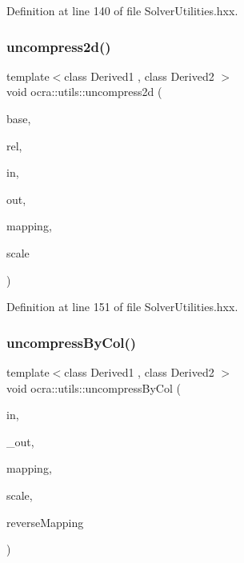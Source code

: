 Definition at line 140 of file Solver\+Utilities.\+hxx.

\hypertarget{namespaceocra_1_1utils_a5189699a011acaa6413bd14c178254c3}{}\label{namespaceocra_1_1utils_a5189699a011acaa6413bd14c178254c3} 
\subsubsection{\texorpdfstring{uncompress2d()}{uncompress2d()}\hspace{0.1cm}{\footnotesize\ttfamily [2/2]}}
{\footnotesize\ttfamily template$<$class Derived1 , class Derived2 $>$ \\
void ocra\+::utils\+::uncompress2d (\begin{DoxyParamCaption}\item[{const \hyperlink{classocra_1_1Variable}{Variable} \&}]{base,  }\item[{const \hyperlink{classocra_1_1Variable}{Variable} \&}]{rel,  }\item[{const Matrix\+Base$<$ Derived1 $>$ \&}]{in,  }\item[{Matrix\+Base$<$ Derived2 $>$ const \&}]{out,  }\item[{std\+::vector$<$ int $>$ \&}]{mapping,  }\item[{double}]{scale }\end{DoxyParamCaption})\hspace{0.3cm}{\ttfamily [inline]}}



Definition at line 151 of file Solver\+Utilities.\+hxx.

\hypertarget{namespaceocra_1_1utils_adecf442a59dee26f5836a070533bcac4}{}\label{namespaceocra_1_1utils_adecf442a59dee26f5836a070533bcac4} 
\subsubsection{\texorpdfstring{uncompress\+By\+Col()}{uncompressByCol()}\hspace{0.1cm}{\footnotesize\ttfamily [1/2]}}
{\footnotesize\ttfamily template$<$class Derived1 , class Derived2 $>$ \\
void ocra\+::utils\+::uncompress\+By\+Col (\begin{DoxyParamCaption}\item[{const Matrix\+Base$<$ Derived1 $>$ \&}]{in,  }\item[{Matrix\+Base$<$ Derived2 $>$ const \&}]{\+\_\+out,  }\item[{const std\+::vector$<$ int $>$ \&}]{mapping,  }\item[{double}]{scale,  }\item[{bool}]{reverse\+Mapping }\end{DoxyParamCaption})\hspace{0.3cm}{\ttfamily [inline]}}



